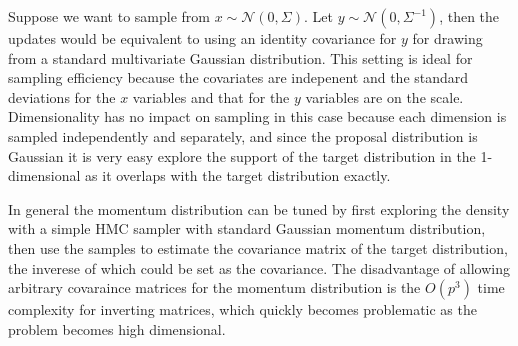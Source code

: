 \documentclass[]{report}
\begin{document}
Suppose we want to sample from $x \sim \mathcal{N}(0,\Sigma)$. Let $y \sim
\mathcal{N}(0,\Sigma^{-1})$, then the updates would be equivalent to using an
identity covariance for $y$ for drawing from a standard multivariate Gaussian
distribution. This setting is ideal for sampling efficiency because the
covariates are indepenent and the standard deviations for the $x$ variables and
that for the $y$ variables are on the scale. Dimensionality has no impact on sampling in this case because
each dimension is sampled independently and separately, and since the proposal
distribution is Gaussian it is very easy explore the support of the target
distribution in the 1-dimensional as it overlaps with the target distribution
exactly. 

In general the momentum distribution can be tuned by first exploring the density
with a simple HMC sampler with standard Gaussian momentum distribution, then use
the samples to estimate the covariance matrix of the target distribution, the
inverese of which could be set as the covariance. The disadvantage of allowing
arbitrary covaraince matrices for the momentum distribution is the $O(p^3)$ time
complexity for inverting matrices, which quickly becomes problematic as the
problem becomes high dimensional. 
\end{document}

